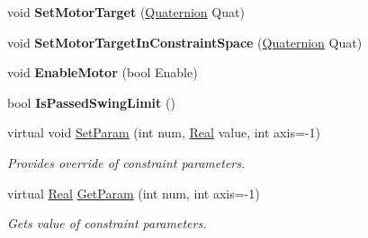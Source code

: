 \begin{DoxyCompactItemize}
\item 
\hypertarget{classphys_1_1ConeTwistConstraint_a5acf239ac6ff3b5999d81d27ba287414}{
void {\bfseries SetMotorTarget} (\hyperlink{classphys_1_1Quaternion}{Quaternion} Quat)}
\label{da/dbc/classphys_1_1ConeTwistConstraint_a5acf239ac6ff3b5999d81d27ba287414}

\item 
\hypertarget{classphys_1_1ConeTwistConstraint_a4ac6124494fa39770f9fc621e6db3715}{
void {\bfseries SetMotorTargetInConstraintSpace} (\hyperlink{classphys_1_1Quaternion}{Quaternion} Quat)}
\label{da/dbc/classphys_1_1ConeTwistConstraint_a4ac6124494fa39770f9fc621e6db3715}

\item 
\hypertarget{classphys_1_1ConeTwistConstraint_aaf0447bbeeca85fa10959072491cafaf}{
void {\bfseries EnableMotor} (bool Enable)}
\label{da/dbc/classphys_1_1ConeTwistConstraint_aaf0447bbeeca85fa10959072491cafaf}

\item 
\hypertarget{classphys_1_1ConeTwistConstraint_ab7306ac08c3fd61cf88567b4e70702c0}{
bool {\bfseries IsPassedSwingLimit} ()}
\label{da/dbc/classphys_1_1ConeTwistConstraint_ab7306ac08c3fd61cf88567b4e70702c0}

\item 
virtual void \hyperlink{classphys_1_1ConeTwistConstraint_a555fc33b10a0c156e0ac93b94587098a}{SetParam} (int num, \hyperlink{namespacephys_af7eb897198d265b8e868f45240230d5f}{Real} value, int axis=-\/1)
\begin{DoxyCompactList}\small\item\em Provides override of constraint parameters. \item\end{DoxyCompactList}\item 
virtual \hyperlink{namespacephys_af7eb897198d265b8e868f45240230d5f}{Real} \hyperlink{classphys_1_1ConeTwistConstraint_aab54f6c56622cef4314d3bbff194421e}{GetParam} (int num, int axis=-\/1)
\begin{DoxyCompactList}\small\item\em Gets value of constraint parameters. \item\end{DoxyCompactList}\end{DoxyCompactItemize}
